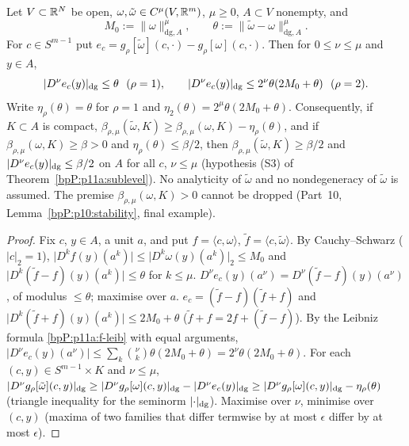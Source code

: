 \begin{lemma}\label{bpP:p11a:stability}
Let $V\subset\mathbb{R}^N$ be open, $\omega,\tilde\omega\in C^\mu(V,\mathbb{R}^m)$, $\mu\ge0$, $A\subset V$ nonempty, and
\[M_0:=\lVert\omega\rVert^\mu_{\mathrm{dg},A},\qquad\theta:=\lVert\tilde\omega-\omega\rVert^\mu_{\mathrm{dg},A}.\]
For $c\in S^{m-1}$ put $e_c=g_\rho[\tilde\omega](c,\cdot)-g_\rho[\omega](c,\cdot)$. Then for $0\le\nu\le\mu$ and $y\in A$,
\[\dgn{D^\nu e_c(y)}\le\theta\ \ (\rho=1),\qquad\dgn{D^\nu e_c(y)}\le2^\nu\theta(2M_0+\theta)\ \ (\rho=2).\]
Write $\eta_\rho(\theta)=\theta$ for $\rho=1$ and $\eta_2(\theta)=2^\mu\theta(2M_0+\theta)$. Consequently, if $K\subset A$ is compact, $\beta_{\rho,\mu}(\tilde\omega,K)\ge\beta_{\rho,\mu}(\omega,K)-\eta_\rho(\theta)$, and if $\beta_{\rho,\mu}(\omega,K)\ge\beta>0$ and $\eta_\rho(\theta)\le\beta/2$, then $\beta_{\rho,\mu}(\tilde\omega,K)\ge\beta/2$ and $\lvert D^\nu e_c(y)\rvert_{\mathrm{dg}}\le\beta/2$ on $A$ for all $c$, $\nu\le\mu$ (hypothesis (S3) of Theorem~\ref{bpP:p11a:sublevel}). No analyticity of $\tilde\omega$ and no nondegeneracy of $\tilde\omega$ is assumed. The premise $\beta_{\rho,\mu}(\omega,K)>0$ cannot be dropped (Part~10, Lemma~\ref{bpP:p10:stability}, final example).
\end{lemma}
\begin{proof}
Fix $c$, $y\in A$, a unit $a$, and put $f=\langle c,\omega\rangle$, $\tilde f=\langle c,\tilde\omega\rangle$. By Cauchy--Schwarz ($\lvert c\rvert_2=1$), $\lvert D^kf(y)(a^k)\rvert\le\lvert D^k\omega(y)(a^k)\rvert_2\le M_0$ and $\lvert D^k(\tilde f-f)(y)(a^k)\rvert\le\theta$ for $k\le\mu$.
\label{stepP:p11a:st-1} $D^\nu e_c(y)(a^\nu)=D^\nu(\tilde f-f)(y)(a^\nu)$, of modulus $\le\theta$; maximise over $a$.
\label{stepP:p11a:st-2} $e_c=(\tilde f-f)(\tilde f+f)$ and $\lvert D^k(\tilde f+f)(y)(a^k)\rvert\le2M_0+\theta$ ($\tilde f+f=2f+(\tilde f-f)$). By the Leibniz formula \ref{bpP:p11a:f-leib} with equal arguments, $\lvert D^\nu e_c(y)(a^\nu)\rvert\le\sum_k\binom\nu k\theta(2M_0+\theta)=2^\nu\theta(2M_0+\theta)$.
\label{stepP:p11a:st-amount} For each $(c,y)\in S^{m-1}\times K$ and $\nu\le\mu$, $\lvert D^\nu g_\rho[\tilde\omega](c,y)\rvert_{\mathrm{dg}}\ge\lvert D^\nu g_\rho[\omega](c,y)\rvert_{\mathrm{dg}}-\lvert D^\nu e_c(y)\rvert_{\mathrm{dg}}\ge\lvert D^\nu g_\rho[\omega](c,y)\rvert_{\mathrm{dg}}-\eta_\rho(\theta)$ (triangle inequality for the seminorm $\lvert \cdot\rvert_{\mathrm{dg}}$). Maximise over $\nu$, minimise over $(c,y)$ (maxima of two families that differ termwise by at most $\epsilon$ differ by at most $\epsilon$).
\end{proof}

